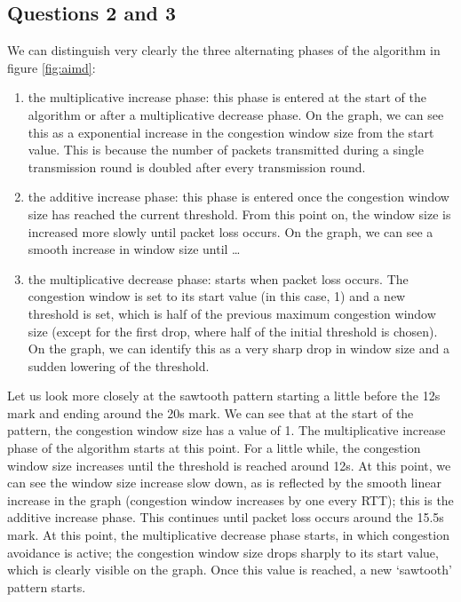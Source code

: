 \documentclass[10pt,a4paper]{article}
\begin{document}
\subsection{Questions 2 and 3}

We can distinguish very clearly the three alternating phases of the
algorithm in figure \ref {fig:aimd}:

\begin{enumerate}
\item the multiplicative increase phase: this phase is entered at the
start of the algorithm or after a multiplicative decrease phase. On
the graph, we can see this as a exponential increase in the congestion
window size from the start value. This is because the number of
packets transmitted during a single transmission round is doubled
after every transmission round.
\item the additive increase phase: this phase is entered once the
congestion window size has reached the current threshold. From this
point on, the window size is increased more slowly until packet loss
occurs. On the graph, we can see a smooth increase in window size
until \ldots
\item the multiplicative decrease phase: starts when packet loss
occurs. The congestion window is set to its start value (in this case,
1) and a new threshold is set, which is half of the previous maximum
congestion window size (except for the first drop, where half of the
initial threshold is chosen). On the graph, we can identify this as a
very sharp drop in window size and a sudden lowering of the threshold.
\end{enumerate}

Let us look more closely at the sawtooth pattern starting a little
before the 12s mark and ending around the 20s mark. We can see that at
the start of the pattern, the congestion window size has a value of
1. The multiplicative increase phase of the algorithm starts at this
point. For a little while, the congestion window size increases until
the threshold is reached around 12s. At this point, we can see the
window size increase slow down, as is reflected by the smooth linear
increase in the graph (congestion window increases by one every RTT);
this is the additive increase phase. This continues until packet loss
occurs around the 15.5s mark. At this point, the multiplicative
decrease phase starts, in which congestion avoidance is active; the
congestion window size drops sharply to its start value, which is
clearly visible on the graph. Once this value is reached, a new
`sawtooth' pattern starts.
\end{document}
